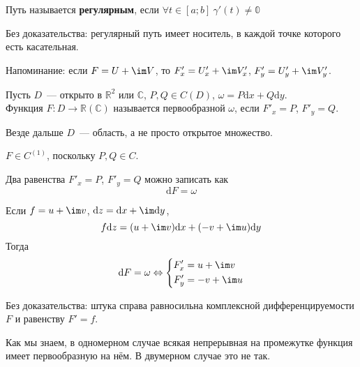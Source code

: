 \documentclass{article}
\begin{document}
    \begin{definition}
        Путь называется \textbf{регулярным}, если $\forall t\in[a;b]~\gamma'(t)\neq\mathbb0$
    \end{definition}
    \begin{claim}
        Без доказательства: регулярный путь имеет носитель, в каждой точке которого есть касательная.
    \end{claim}
    \begin{remark}
        Напоминание: если $F=U+\im V$, то $F'_x=U'_x+\im V'_x$, $F'_y=U'_y+\im V'_y$.
    \end{remark}
    \begin{definition}
        Пусть $D$~--- открыто в $\mathbb R^2$ или $\mathbb C$, $P,Q\in C(D)$, $\omega=P\mathrm dx+Q\mathrm dy$.\\
        Функция $F\colon D\to\mathbb R(\mathbb C)$ называется первообразной $\omega$, если $F'_x=P$, $F'_y=Q$.
    \end{definition}
    \begin{remark}
        Везде дальше $D$~--- область, а не просто открытое множество.
    \end{remark}
    \begin{claim}
        $F\in C^{(1)}$, поскольку $P,Q\in C$.
    \end{claim}
    \begin{claim}
        Два равенства $F'_x=P$, $F'_y=Q$ можно записать как
        $$\mathrm dF=\omega$$
    \end{claim}
    \begin{claim}
        Если $f=u+\im v$, $\mathrm dz=\mathrm dx+\im\mathrm dy$,
        $$
        f\mathrm dz=(u+\im v)\mathrm dx+(-v+\im u)\mathrm dy
        $$
        Тогда
        $$
        \mathrm dF=\omega\Leftrightarrow\left\{\begin{aligned}
            F'_x&=u+\im v\\
            F'_y&=-v+\im u
        \end{aligned}\right.
        $$
    \end{claim}
    \begin{remark}
        Без доказательства: штука справа равносильна комплексной дифференцируемости $F$ и равенству $F'=f$.
    \end{remark}
    \begin{remark}
        Как мы знаем, в одномерном случае всякая непрерывная на промежутке функция имеет первообразную на нём. В двумерном случае это не так.
    \end{remark}
\end{document}
